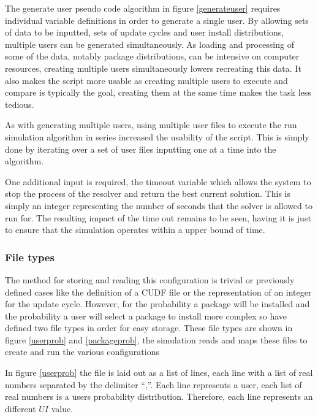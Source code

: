 The generate user pseudo code algorithm in figure \ref{generateuser} requires individual variable definitions in order to generate a single user.
By allowing sets of data to be inputted, sets of update cycles and user install distributions, multiple users can be generated simultaneously.
As loading and processing of some of the data, notably package distributions, can be intensive on computer resources, 
creating multiple users simultaneously lowers recreating this data.
It also makes the script more usable as creating multiple users to execute and compare is typically the goal,
creating them at the same time makes the task less tedious.

As with generating multiple users, using multiple user files to execute the run simulation algorithm in series increased the usability of the script.
This is simply done by iterating over a set of user files inputting one at a time into the algorithm. 

One additional input is required, the timeout variable which allows the system to stop the process of the resolver and return the best current solution.
This is simply an integer representing the number of seconds that the solver is allowed to run for.
The resulting impact of the time out remains to be seen, having it is just to ensure that the simulation operates within a upper bound of time.

\subsubsection{File types}
The method for storing and reading this configuration is trivial or previously defined cases like the definition of a CUDF file or the representation of an integer for the update cycle.
However, for the probability a package will be installed and the probability a user will select a package to install more complex so have defined two file types in order for easy storage.
These file types are shown in figure \ref{userprob} and \ref{packageprob}, the simulation reads and maps these files to create and run the various configurations

In figure \ref{userprob} the file is laid out as a list of lines, each line with a list of real numbers separated by the delimiter ``,''.
Each line represents a user, each list of real numbers is a users probability distribution.
Therefore, each line represents an different $UI$ value.

